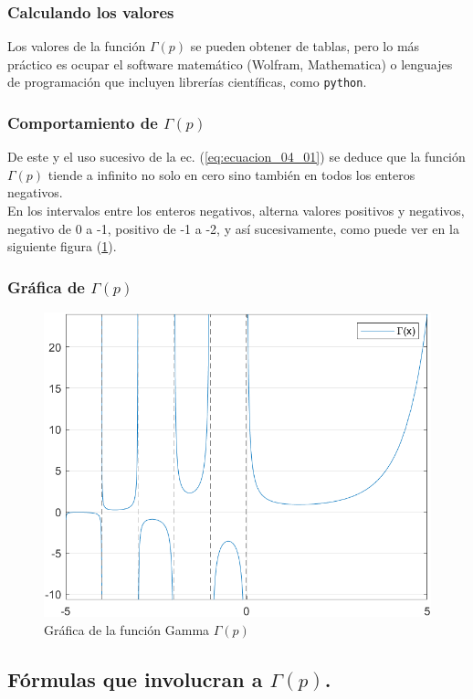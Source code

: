 \documentclass[12pt]{beamer}
\begin{document}
\begin{frame}
\frametitle{Calculando los valores}
Los valores de la función $\Gamma (p)$ se pueden obtener de tablas, pero lo más práctico es ocupar el software matemático (Wolfram, Mathematica) o lenguajes de programación que incluyen librerías científicas, como \texttt{python}.
\end{frame}
\begin{frame}
\frametitle{Comportamiento de $\Gamma (p)$}
De este y el uso sucesivo de la ec. (\ref{eq:ecuacion_04_01}) se deduce que la función $\Gamma (p)$ tiende a infinito no solo en cero sino también en todos los enteros negativos.
\\
\bigskip
\pause
En los intervalos entre los enteros negativos, alterna valores positivos y negativos, negativo de 0 a -1, positivo de -1 a -2, y así sucesivamente, como puede ver en la siguiente figura (\ref{fig:figura_plot_gamma}).
\end{frame}
\begin{frame}
\frametitle{Gráfica de $\Gamma (p)$}
\begin{figure}[H]
   \centering
   \includegraphics[scale=0.6]{Imagenes/Plot_Gamma.png}
   \caption{Gráfica de la función Gamma $\Gamma (p)$}
   \label{fig:figura_plot_gamma}
\end{figure}
\end{frame}

\subsection{Fórmulas que involucran a \texorpdfstring{$\Gamma (p)$}{G (p)}.}
\end{document}

